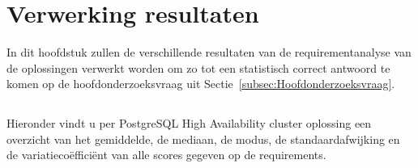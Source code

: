 
\chapter{Verwerking resultaten}
\label{ch:Verwerking resultaten}

In dit hoofdstuk zullen de verschillende resultaten van de requirementanalyse van de oplossingen verwerkt worden om zo tot een statistisch correct antwoord te komen op de hoofdonderzoeksvraag uit Sectie~\ref{subsec:Hoofdonderzoeksvraag}.

\section{}
\label{sec:Resultaten requirements}



Hieronder vindt u per PostgreSQL High Availability cluster oplossing een overzicht van het gemiddelde, de mediaan, de modus, de standaardafwijking en de variatiecoëfficiënt van alle scores gegeven op de requirements.







